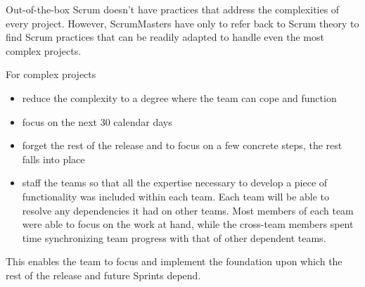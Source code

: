 Out-of-the-box Scrum doesn’t have practices that address the complexities of every project. However, ScrumMasters have only to refer back to Scrum theory to find Scrum practices that can be readily adapted to handle even the most complex projects.

For complex projects
\begin{itemize}
  \item reduce the complexity to a degree where the team can cope and function
  \item focus on the next 30 calendar days
  \item forget the rest of the release and to focus on a few concrete steps, the rest falls into place
  \item staff the teams so that all the expertise necessary to develop a piece of functionality was included within each team. Each team will be able to resolve any dependencies it had on other teams. Most members of each team were able to focus on the work at hand, while the cross-team members spent time synchronizing team progress with that of other dependent teams.
\end{itemize}

This enables the team to focus and implement the foundation upon which the rest of the release and future Sprints depend.

